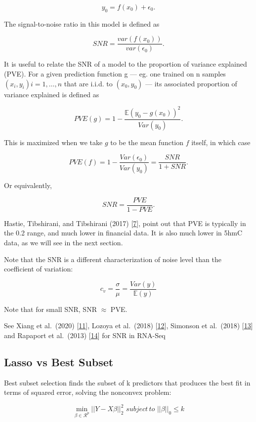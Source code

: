 \documentclass[
]{book}
\begin{document}
\[y_0 = f(x_0) + \epsilon_0.\]

The signal-to-noise ratio in this model is defined as

\[SNR=\frac{var(f(x_0))}{var(\epsilon_0)}.\]

It is useful to relate the SNR of a model to the proportion of variance explained (PVE).
For a given prediction function g --- eg. one trained on n samples
\((x_i, y_i) i = 1, \dots, n\) that are i.i.d. to \((x_0, y_0)\) --- its
associated proportion of variance explained is defined as

\[PVE(g)=1 - \frac{\mathbb{E}(y_0-g(x_0))^2}{Var(y_0)}.\]

This is maximized when we take \(g\) to be the mean function \(f\) itself,
in which case

\[PVE(f) = 1 - \frac{Var(\epsilon_0)}{Var(y_0)} = \frac{SNR}{1+SNR}.\]

Or equivalently,

\[SNR = \frac{PVE}{1-PVE}.\]

Hastie, Tibshirani, and Tibshirani (2017) {[}\protect\hyperlink{ref-Hastie:2017aa}{7}{]}, point out that
PVE is typically in the 0.2 range, and much lower in financial data. It
is also much lower in 5hmC data, as we will see in the next section.

Note that the SNR is a different characterization of noise level than the
coefficient of variation:

\[c_v = \frac{\sigma}{\mu}=\frac{Var(y)}{\mathbb{E}(y)}\]

Note that for small SNR, SNR \(\approx\) PVE.

See Xiang et al.~(2020) {[}\protect\hyperlink{ref-Xiang:2020aa}{11}{]}, Lozoya et al.~(2018) {[}\protect\hyperlink{ref-Lozoya:2018aa}{12}{]},
Simonson et al.~(2018) {[}\protect\hyperlink{ref-Simonsen:2018aa}{13}{]} and
Rapaport et al.~(2013) {[}\protect\hyperlink{ref-Rapaport:2013aa}{14}{]} for SNR in RNA-Seq

\hypertarget{lasso-vs-best-subset}{%
\subsection*{Lasso vs Best Subset}\label{lasso-vs-best-subset}}

Best subset selection finds the subset of k predictors that
produces the best fit in terms of squared error, solving the nonconvex problem:

\begin{equation}
 \min_{\beta \in \mathcal{R}^p} ||Y - X\beta||^2_2 \, \, subject \, to \, \, ||\beta||_0 \leq k
 \label{eq:bestSub}
\end{equation}
\end{document}
